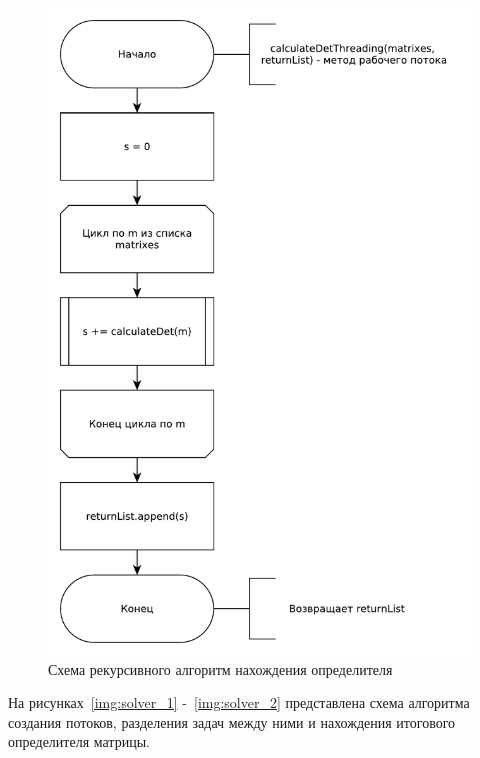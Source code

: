 \documentclass[12pt]{report}
\begin{document}
    \begin{figure}[H]
        \centering
        \includegraphics[width=0.85\linewidth]{img/thread_schema}
        \caption{
            Схема рекурсивного алгоритм нахождения определителя
        }
        \label{img:thread_schema}
    \end{figure}

    На рисунках~\ref{img:solver_1} -~\ref{img:solver_2} представлена схема алгоритма создания потоков,
    разделения задач между ними и нахождения итогового определителя матрицы.
\end{document}

